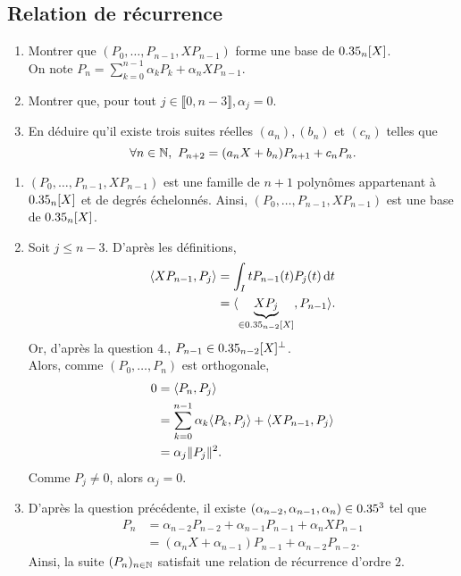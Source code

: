 \subsection{Relation de récurrence}

\begin{exercice}
    \begin{enumerate}
        \item Montrer que $(P_0, \dots, P_{n-1}, X P_{n-1})$ forme une base de $0.35_n[X]$. \\
        On note $P_n = \sum\limits_{k=0}^{n-1} \alpha_k P_k + \alpha_n X P_{n-1}$.
        \item Montrer que, pour tout $j \in \llbracket 0, n - 3 \rrbracket, \alpha_j = 0$.
        \item En déduire qu'il existe trois suites réelles $(a_n), (b_n)$ et $(c_n)$ telles que 
        $$\forall n \in \mathbb{N},\ P_{n+2} = (a_n X + b_n) P_{n+1} + c_n P_n.$$
    \end{enumerate}
\end{exercice}

\begin{solution}
    \begin{enumerate}
        \item $(P_0, \dots, P_{n-1}, X P_{n-1})$ est une famille de $n+1$ polynômes appartenant à $0.35_n[X]$ et de degrés échelonnés. Ainsi, $(P_0, \dots, P_{n-1}, X P_{n-1})$ est une base de $0.35_n[X]$.
        \item Soit $j \leqslant n-3$. D'après les définitions,
        \begin{align*}
            \langle X P_{n-1}, P_j \rangle &= \int_I t P_{n-1}(t) P_j(t) \, \mathrm{d} t \\
            &= \langle \underbrace{X P_j}_{\in 0.35_{n-2}[X]}, P_{n-1} \rangle.
        \end{align*}
        Or, d'après la question $4.$, $P_{n-1} \in 0.35_{n-2}[X]^\perp$. \\
        Alors, comme $(P_0, \dots, P_n)$ est orthogonale,
        \begin{align*}
            0 &= \langle P_n, P_j \rangle \\
            &= \sum_{k=0}^{n-1} \alpha_k \langle P_k, P_j \rangle + \langle X P_{n-1}, P_j \rangle \\
            &= \alpha_j \Vert P_j \Vert^2.
        \end{align*}
        Comme $P_j \not= 0$, alors $\alpha_j = 0$.
        \item D'après la question précédente, il existe
        $(\alpha_{n-2}, \alpha_{n-1}, \alpha_n) \in 0.35^3$ tel que 
        \begin{align*}
            P_n &= \alpha_{n-2} P_{n-2} + \alpha_{n-1} P_{n-1} + \alpha_n X P_{n-1} \\
            &= (\alpha_n X + \alpha_{n-1}) P_{n-1} + \alpha_{n-2} P_{n-2}.
        \end{align*}
        Ainsi, la suite $(P_n)_{n \in \mathbb{N}}$ satisfait une relation de récurrence d'ordre $2$. 
    \end{enumerate}
\end{solution}

